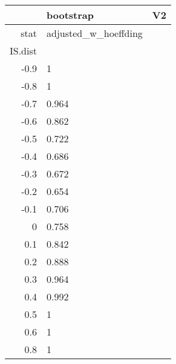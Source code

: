 \begin{table}[ht]
\centering
\begingroup\tiny
\begin{tabular}{rll}
  \hline
 & bootstrap & V2 \\ 
  \hline
stat & adjusted\_w\_hoeffding &  \\ 
  IS.dist &  &  \\ 
  -0.9 & 1 &  \\ 
  -0.8 & 1 &  \\ 
  -0.7 & 0.964 &  \\ 
  -0.6 & 0.862 &  \\ 
  -0.5 & 0.722 &  \\ 
  -0.4 & 0.686 &  \\ 
  -0.3 & 0.672 &  \\ 
  -0.2 & 0.654 &  \\ 
  -0.1 & 0.706 &  \\ 
  0 & 0.758 &  \\ 
  0.1 & 0.842 &  \\ 
  0.2 & 0.888 &  \\ 
  0.3 & 0.964 &  \\ 
  0.4 & 0.992 &  \\ 
  0.5 & 1 &  \\ 
  0.6 & 1 &  \\ 
  0.8 & 1 &  \\ 
   \hline
\end{tabular}
\endgroup
\end{table}
